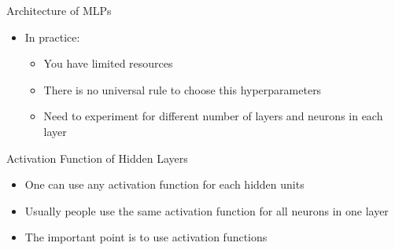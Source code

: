 \begin{frame}{Architecture of MLPs}
    \begin{itemize}
        \item In practice:
        \begin{itemize}
            \item You have limited resources
            \item There is no universal rule to choose this hyperparameters
            \item Need to experiment for different number of layers and neurons in each layer
        \end{itemize}
    \end{itemize}
\end{frame}

\begin{frame}{Activation Function of Hidden Layers}
    \begin{itemize}
        \item One can use any activation function for each hidden units
        \item Usually people use the same activation function for all neurons in one layer
        \item The important point is to use  activation functions
    \end{itemize}
    \begin{figure}[H]
        \centering
        \begin{subfigure}[b]{0.55\textwidth}
            \centering
        \end{subfigure}

\end{figure}
\end{frame}
